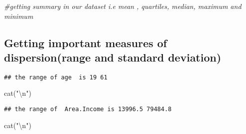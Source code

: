 \documentclass[
]{article}
\newenvironment{Shaded}{\begin{snugshade}}{\end{snugshade}}
\newcommand{\CommentTok}[1]{\textcolor[rgb]{0.56,0.35,0.01}{\textit{#1}}}
\newcommand{\FunctionTok}[1]{\textcolor[rgb]{0.00,0.00,0.00}{#1}}
\newcommand{\NormalTok}[1]{#1}
\newcommand{\SpecialCharTok}[1]{\textcolor[rgb]{0.00,0.00,0.00}{#1}}
\newcommand{\StringTok}[1]{\textcolor[rgb]{0.31,0.60,0.02}{#1}}
\begin{document}
\begin{Shaded}
\begin{Highlighting}[]
\CommentTok{\#getting summary in our dataset i.e mean , quartiles, median, maximum and minimum}
\end{Highlighting}
\end{Shaded}

\hypertarget{getting-important-measures-of-dispersionrange-and-standard-deviation}{%
\subsection{Getting important measures of dispersion(range and standard
deviation)}\label{getting-important-measures-of-dispersionrange-and-standard-deviation}}

\begin{Shaded}
\end{Shaded}

\begin{verbatim}
## the range of age  is 19 61
\end{verbatim}

\begin{Shaded}
\begin{Highlighting}[]
\FunctionTok{cat}\NormalTok{(}\StringTok{"}\SpecialCharTok{\textbackslash{}n}\StringTok{"}\NormalTok{)}
\end{Highlighting}
\end{Shaded}

\begin{Shaded}
\end{Shaded}

\begin{verbatim}
## the range of  Area.Income is 13996.5 79484.8
\end{verbatim}

\begin{Shaded}
\begin{Highlighting}[]
\FunctionTok{cat}\NormalTok{(}\StringTok{"}\SpecialCharTok{\textbackslash{}n}\StringTok{"}\NormalTok{)}
\end{Highlighting}
\end{Shaded}
\end{document}
